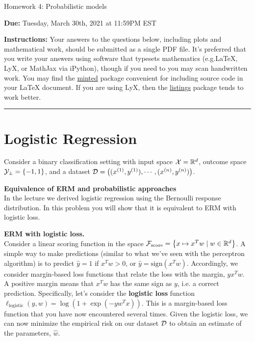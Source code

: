 \documentclass{article}
\newcommand{\nyuparagraph}[1]{\vspace{0.3cm}\textcolor{nyupurple}{\bf \large #1}\\}
\newcommand{\ruleskip}{\bigskip\hrule\bigskip}
\theoremstyle{plain}
\theoremstyle{definition}
\begin{document}

\pagestyle{myheadings} 

\begin{center}
{\Large
Homework 4: Probabilistic models
} 
\end{center}

{
{ \color{nyupurple} \textbf{Due:} Tuesday, March 30th, 2021 at 11:59PM EST} 
} 

\textbf{Instructions: }Your answers to the questions below, including plots and mathematical
 work, should be submitted as a single PDF file.  It's preferred that you write your answers using software that typesets mathematics (e.g.LaTeX, LyX, or MathJax via iPython), though if you need to you may scan handwritten work.  You may find the \href{https://github.com/gpoore/minted}{minted} package convenient for including source code in your LaTeX document.  If you are using LyX, then the \href{https://en.wikibooks.org/wiki/LaTeX/Source_Code_Listings}{listings} package tends to work better.

\ruleskip

\section{Logistic Regression}
\label{sec:lr}
Consider a binary classification setting with input
space $\mathcal{X}=\mathbb{R}^{d}$, outcome space $\mathcal{Y}_{\pm}=\left\{ -1,1\right\} $,
and a dataset $\mathcal{D}=\left((x^{(1)},y^{(1)}),\cdots,(x^{(n)},y^{(n)})\right)$.


\nyuparagraph{\label{subsec:erm-bernoulli-setup}Equivalence of ERM and probabilistic
approaches}
In the lecture we derived logistic regression using the Bernoulli response distribution.
In this problem you will show that it is equivalent to ERM with logistic loss.

\textbf{ERM with logistic loss.}\\
Consider a linear scoring function in the space $\mathcal{F}_{\text{score}}=\left\{ x\mapsto x^{T}w\mid w\in\mathbb{R}^{d}\right\} $.
A simple way to make predictions (similar to what we've seen with the perceptron algorithm)
is to predict $\hat{y}=1$ if $x^Tw > 0$, or $\hat{y} = \text{sign}(x^Tw)$.
Accordingly, we consider margin-based loss functions that relate the loss with the margin, $yx^Tw$.
A positive margin means that $x^Tw$ has the same sign as $y$, i.e. a correct prediction.
Specifically, let's consider the \textbf{logistic loss} function $\ell_{\text{logistic}}(y, w)=\log\left(1+\exp(-yw^Tx)\right)$.
This is a margin-based loss function that you have now encountered several times.
Given the logistic loss, we can now minimize the empirical risk on our dataset $\mathcal{D}$ to obtain an estimate of the parameters, $\hat{w}$.
\end{document}
